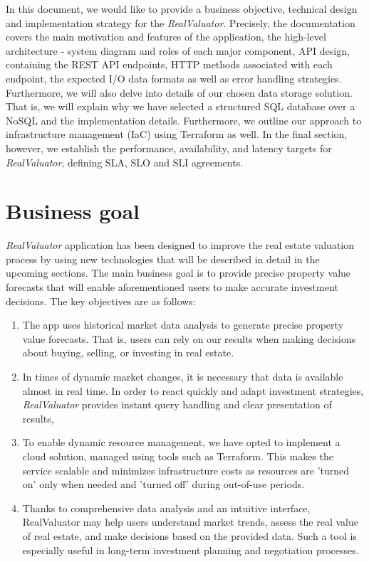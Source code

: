 \documentclass{article}
\begin{document}
 In this document, we would like to provide a business objective, technical design and implementation strategy for the \textit{RealValuator}. Precisely, the documentation covers the main motivation and features of the application, the high-level architecture - system diagram and roles of each major component, API design, containing the REST API endpoints, HTTP methods associated with each endpoint, the expected I/O data formats as well as error handling strategies. Furthermore, we will also delve into details of our chosen data storage solution. That is, we will explain why we have selected a structured SQL database over a NoSQL and the implementation details. Furthermore, we outline our approach to infrastructure management (IaC) using Terraform as well. In the final section, however, we establish the performance, availability, and latency targets for \textit{RealValuator}, defining SLA, SLO and SLI agreements. 


\section{Business goal}

\textit{RealValuator} application has been designed to improve the real estate valuation process by using new technologies that will be described in detail in the upcoming sections. The main business goal is to provide precise property value forecasts that will enable aforementioned users to make accurate investment decisions. The key objectives are as follows:

\begin{enumerate}
    \item The app uses historical market data analysis to generate precise property value forecasts. That is, users can rely on our results when making decisions about buying, selling, or investing in real estate.

    \item In times of dynamic market changes, it is necessary that data is available almost in real time. In order to react quickly and adapt investment strategies, \textit{RealValuator} provides instant query handling and clear presentation of results,

    \item To enable dynamic resource management, we have opted to implement a cloud solution, managed using tools such as Terraform. This makes the service scalable and minimizes infrastructure costs as resources are 'turned on' only when needed and 'turned off' during out-of-use periods.

    \item Thanks to comprehensive data analysis and an intuitive interface, RealValuator may help users understand market trends, assess the real value of real estate, and make decisions based on the provided data. Such a tool is especially useful in long-term investment planning and negotiation processes.
\end{enumerate}
\end{document}

